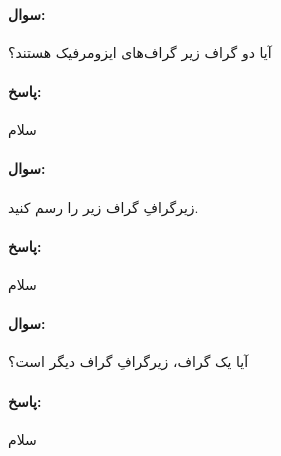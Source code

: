 \documentclass[a4paper,10pt]{article}
\begin{document}
    \paragraph{سوال:} آیا دو گراف زیر گراف‌های ایزومرفیک هستند؟

    \paragraph{پاسخ:} سلام

    \noindent\hrulefill

    \paragraph{سوال:} زیرگرافِ گراف زیر را رسم کنید.

    \paragraph{پاسخ:} سلام

    \noindent\hrulefill

    \paragraph{سوال:} آیا یک گراف، زیرگرافِ گراف دیگر است؟
 
    \paragraph{پاسخ:} سلام
\end{document}
